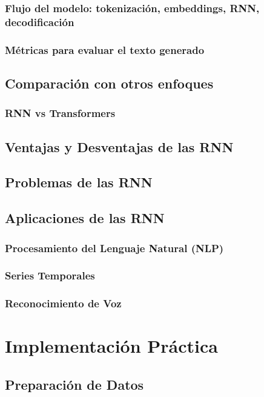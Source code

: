 \documentclass{article}
\begin{document}
\subsubsection{Flujo del modelo: tokenización, embeddings, RNN, decodificación}
\subsubsection{Métricas para evaluar el texto generado}

\subsection{Comparación con otros enfoques}
\subsubsection{RNN vs Transformers}

\subsection{Ventajas y Desventajas de las RNN}
\subsection{Problemas de las RNN}
\subsection{Aplicaciones de las RNN}
\subsubsection{Procesamiento del Lenguaje Natural (NLP)}
\subsubsection{Series Temporales}
\subsubsection{Reconocimiento de Voz}

\newpage

\section{Implementación Práctica}
\subsection{Preparación de Datos}
\end{document}
